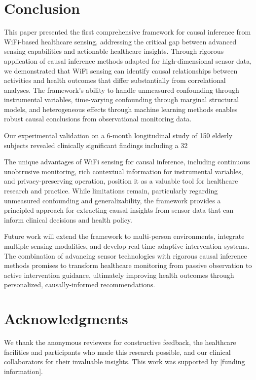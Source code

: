 \documentclass[journal]{IEEEtran}
\begin{document}
\section{Conclusion}

This paper presented the first comprehensive framework for causal inference from WiFi-based healthcare sensing, addressing the critical gap between advanced sensing capabilities and actionable healthcare insights. Through rigorous application of causal inference methods adapted for high-dimensional sensor data, we demonstrated that WiFi sensing can identify causal relationships between activities and health outcomes that differ substantially from correlational analyses. The framework's ability to handle unmeasured confounding through instrumental variables, time-varying confounding through marginal structural models, and heterogeneous effects through machine learning methods enables robust causal conclusions from observational monitoring data.

Our experimental validation on a 6-month longitudinal study of 150 elderly subjects revealed clinically significant findings including a 32%

The unique advantages of WiFi sensing for causal inference, including continuous unobtrusive monitoring, rich contextual information for instrumental variables, and privacy-preserving operation, position it as a valuable tool for healthcare research and practice. While limitations remain, particularly regarding unmeasured confounding and generalizability, the framework provides a principled approach for extracting causal insights from sensor data that can inform clinical decisions and health policy.

Future work will extend the framework to multi-person environments, integrate multiple sensing modalities, and develop real-time adaptive intervention systems. The combination of advancing sensor technologies with rigorous causal inference methods promises to transform healthcare monitoring from passive observation to active intervention guidance, ultimately improving health outcomes through personalized, causally-informed recommendations.

\section*{Acknowledgments}

We thank the anonymous reviewers for constructive feedback, the healthcare facilities and participants who made this research possible, and our clinical collaborators for their invaluable insights. This work was supported by [funding information].



\end{document}
